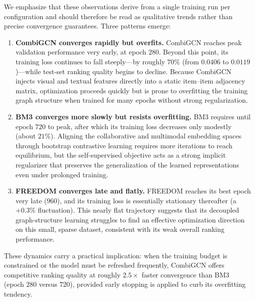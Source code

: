 We emphasize that these observations derive from a single training run per configuration and should therefore be read as qualitative trends rather than precise convergence guarantees. Three patterns emerge:
\begin{enumerate}
    \item \textbf{CombiGCN converges rapidly but overfits.} CombiGCN reaches peak validation performance very early, at epoch $280$. Beyond this point, its training loss continues to fall steeply---by roughly $70\%$ (from $0.0406$ to $0.0119$)---while test-set ranking quality begins to decline. Because CombiGCN injects visual and textual features directly into a static item--item adjacency matrix, optimization proceeds quickly but is prone to overfitting the training graph structure when trained for many epochs without strong regularization.
    \item \textbf{BM3 converges more slowly but resists overfitting.} BM3 requires until epoch $720$ to peak, after which its training loss decreases only modestly (about $21\%$). Aligning the collaborative and multimodal embedding spaces through bootstrap contrastive learning requires more iterations to reach equilibrium, but the self-supervised objective acts as a strong implicit regularizer that preserves the generalization of the learned representations even under prolonged training.
    \item \textbf{FREEDOM converges late and flatly.} FREEDOM reaches its best epoch very late ($960$), and its training loss is essentially stationary thereafter (a $+0.3\%$ fluctuation). This nearly flat trajectory suggests that its decoupled graph-structure learning struggles to find an effective optimization direction on this small, sparse dataset, consistent with its weak overall ranking performance.
\end{enumerate}

These dynamics carry a practical implication: when the training budget is constrained or the model must be refreshed frequently, CombiGCN offers competitive ranking quality at roughly $2.5\times$ faster convergence than BM3 (epoch $280$ versus $720$), provided early stopping is applied to curb its overfitting tendency.
